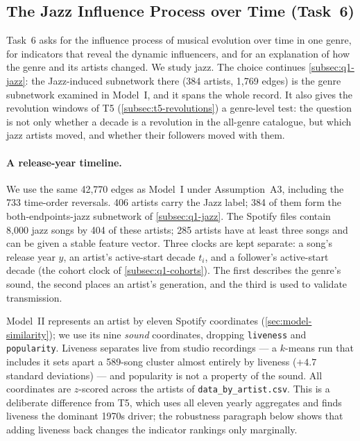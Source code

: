 
\subsection{The Jazz Influence Process over Time (Task~6)}\label{subsec:t6-jazz}

Task~6 asks for the influence process of musical evolution over time in one genre, for indicators
that reveal the dynamic influencers, and for an explanation of how the genre and its artists
changed. We study jazz. The choice continues \cref{subsec:q1-jazz}: the Jazz-induced subnetwork
there (384 artists, 1,769 edges) is the genre subnetwork examined in Model~I, and it spans the
whole record. It also gives the revolution windows of T5 (\cref{subsec:t5-revolutions}) a
genre-level test: the question is not only whether a decade is a revolution in the all-genre
catalogue, but which jazz artists moved, and whether their followers moved with them.

\paragraph{A release-year timeline.}
We use the same 42,770 edges as Model~I under Assumption~A3, including the 733 time-order
reversals. 406 artists carry the Jazz label; 384 of them form the both-endpoints-jazz
subnetwork of \cref{subsec:q1-jazz}. The Spotify files contain 8,000 jazz songs by
404 of these artists; 285 artists have at least three songs and can be given
a stable feature vector. Three clocks are kept separate: a song's release year \(y\), an artist's
active-start decade \(t_i\), and a follower's active-start decade (the cohort clock of
\cref{subsec:q1-cohorts}). The first describes the genre's sound, the second places an artist's
generation, and the third is used to validate transmission.

Model~II represents an artist by eleven Spotify coordinates (\cref{sec:model-similarity}); we use
its nine \emph{sound} coordinates, dropping \texttt{liveness} and \texttt{popularity}. Liveness
separates live from studio recordings --- a \(k\)-means run that includes it sets apart a
589-song cluster almost entirely by liveness ($+4.7$ standard deviations) --- and
popularity is not a property of the sound. All coordinates are \(z\)-scored across the artists of
\texttt{data\_by\_artist.csv}. This is a deliberate difference from T5, which uses all eleven
yearly aggregates and finds liveness the dominant 1970s driver; the robustness paragraph below
shows that adding liveness back changes the indicator rankings only marginally.

